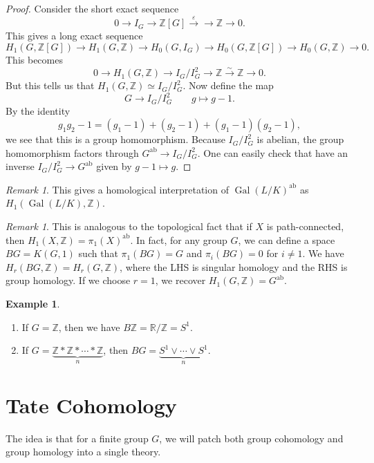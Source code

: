 \documentclass[leqno, openany]{memoir}
\theoremstyle{definition}
\newtheorem{exm}[thm]{Example}
\theoremstyle{remark}
\newtheorem{rmk}[thm]{Remark}
\theoremstyle{plain}
\theoremstyle{definition}
\theoremstyle{remark}
\newcommand{\R}{\mathbb{R}}
\newcommand{\Z}{\mathbb{Z}}
\newcommand{\ep}{\varepsilon}
\newcommand{\mr}[1]{\mathrm{#1}}
\DeclareMathOperator{\Gal}{Gal}
\begin{document}
\begin{proof}
    Consider the short exact sequence 
    \[ 0 \to I_G \to \Z[G] \xrightarrow{\ep} \to \Z \to 0. \]
    This gives a long exact sequence 
    \[ H_1(G, \Z[G]) \to H_1(G, \Z) \to H_0(G, I_G) \to H_0(G, \Z[G]) \to H_0(G, \Z) \to 0. \]
    This becomes
    \[ 0 \to H_1(G, \Z) \to I_G / I_G^2 \to \Z \xrightarrow{\sim} \Z \to 0. \]
    But this tells us that $H_1(G, \Z) \simeq I_G / I_G^2$. Now define the map
    \[ G \to I_G / I_G^2 \qquad g \mapsto g-1. \]
    By the identity
    \[ g_1 g_2 - 1 = (g_1 - 1) + (g_2 - 1) + (g_1 - 1)(g_2 - 1), \]
    we see that this is a group homomorphism. Because $I_G/I_G^2$ is abelian, the group homomorphism factors through $G^{\mr{ab}} \to I_G / I_G^2$. One can easily check that have an inverse $I_G / I_G^2 \to G^{\mr{ab}}$ given by $g-1 \mapsto g$.
\end{proof}

\begin{rmk}
    This gives a homological interpretation of ${\Gal(L/K)}^{\mr{ab}}$ as $H_1(\Gal(L/K), \Z)$.
\end{rmk}

\begin{rmk}
    This is analogous to the topological fact that if $X$ is path-connected, then $H_1(X, \Z) = {\pi_1(X)}^{\mr{ab}}$. In fact, for any group $G$, we can define a space $BG = K(G, 1)$ such that $\pi_1(BG) = G$ and $\pi_i(BG) = 0$ for $i \neq 1$. We have $H_r(BG, \Z) = H_r(G, \Z)$, where the LHS is singular homology and the RHS is group homology. If we choose $r = 1$, we recover $H_1(G, \Z) = G^{\mr{ab}}$.
\end{rmk}

\begin{exm}\leavevmode
    \begin{enumerate}
        \item If $G = \Z$, then we have $B\Z = \R / \Z = S^1$. 
        \item If $G = \underbrace{\Z * \Z * \cdots * \Z}_n$, then $BG = \underbrace{S^1 \vee \cdots \vee S^1}_n$.
    \end{enumerate}
\end{exm}

\section{Tate Cohomology}%
\label{sec:tate_cohomology}

The idea is that for a finite group $G$, we will patch both group cohomology and group homology into a single theory.
\end{document}
